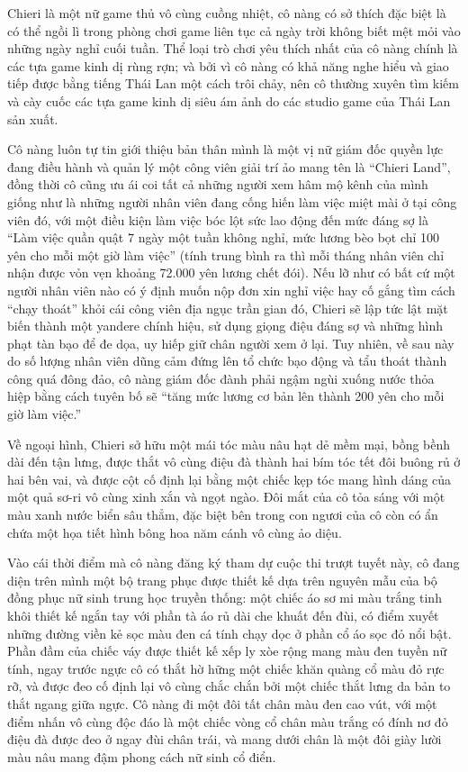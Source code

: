 \documentclass[../main.tex]{subfiles}
\begin{document}
Chieri là một nữ game thủ vô cùng cuồng nhiệt, cô nàng có sở thích đặc biệt là có thể ngồi lì trong phòng chơi game liên tục cả ngày trời không biết mệt mỏi vào những ngày nghỉ cuối tuần. Thể loại trò chơi yêu thích nhất của cô nàng chính là các tựa game kinh dị rùng rợn; và bởi vì cô nàng có khả năng nghe hiểu và giao tiếp được bằng tiếng Thái Lan một cách trôi chảy, nên cô thường xuyên tìm kiếm và cày cuốc các tựa game kinh dị siêu ám ảnh do các studio game của Thái Lan sản xuất.

Cô nàng luôn tự tin giới thiệu bản thân mình là một vị nữ giám đốc quyền lực đang điều hành và quản lý một công viên giải trí ảo mang tên là ``Chieri Land'', đồng thời cô cũng ưu ái coi tất cả những người xem hâm mộ kênh của mình giống như là những người nhân viên đang cống hiến làm việc miệt mài ở tại công viên đó, với một điều kiện làm việc bóc lột sức lao động đến mức đáng sợ là ``Làm việc quần quật 7 ngày một tuần không nghỉ, mức lương bèo bọt chỉ 100 yên cho mỗi một giờ làm việc'' (tính trung bình ra thì mỗi tháng nhân viên chỉ nhận được vỏn vẹn khoảng 72.000 yên lương chết đói). Nếu lỡ như có bất cứ một người nhân viên nào có ý định muốn nộp đơn xin nghỉ việc hay cố gắng tìm cách ``chạy thoát'' khỏi cái công viên địa ngục trần gian đó, Chieri sẽ lập tức lật mặt biến thành một yandere chính hiệu, sử dụng giọng điệu đáng sợ và những hình phạt tàn bạo để đe dọa, uy hiếp giữ chân người xem ở lại. Tuy nhiên, về sau này do số lượng nhân viên dũng cảm đứng lên tổ chức bạo động và tẩu thoát thành công quá đông đảo, cô nàng giám đốc đành phải ngậm ngùi xuống nước thỏa hiệp bằng cách tuyên bố sẽ ``tăng mức lương cơ bản lên thành 200 yên cho mỗi giờ làm việc.''

Về ngoại hình, Chieri sở hữu một mái tóc màu nâu hạt dẻ mềm mại, bồng bềnh dài đến tận lưng, được thắt vô cùng điệu đà thành hai bím tóc tết đôi buông rủ ở hai bên vai, và được cột cố định lại bằng một chiếc kẹp tóc mang hình dáng của một quả sơ-ri vô cùng xinh xắn và ngọt ngào. Đôi mắt của cô tỏa sáng với một màu xanh nước biển sâu thẳm, đặc biệt bên trong con ngươi của cô còn có ẩn chứa một họa tiết hình bông hoa năm cánh vô cùng ảo diệu.

Vào cái thời điểm mà cô nàng đăng ký tham dự cuộc thi trượt tuyết này, cô đang diện trên mình một bộ trang phục được thiết kế dựa trên nguyên mẫu của bộ đồng phục nữ sinh trung học truyền thống: một chiếc áo sơ mi màu trắng tinh khôi thiết kế ngắn tay với phần tà áo rủ dài che khuất đến đùi, có điểm xuyết những đường viền kẻ sọc màu đen cá tính chạy dọc ở phần cổ áo sọc đỏ nổi bật. Phần đầm của chiếc váy được thiết kế xếp ly xòe rộng mang màu đen tuyền nữ tính, ngay trước ngực cô có thắt hờ hững một chiếc khăn quàng cổ màu đỏ rực rỡ, và được đeo cố định lại vô cùng chắc chắn bởi một chiếc thắt lưng da bản to thắt ngang giữa ngực. Cô nàng đi một đôi tất chân màu đen cao vút, với một điểm nhấn vô cùng độc đáo là một chiếc vòng cổ chân màu trắng có đính nơ đỏ điệu đà được đeo ở ngay đùi chân trái, và mang dưới chân là một đôi giày lười màu nâu mang đậm phong cách nữ sinh cổ điển.
\end{document}
